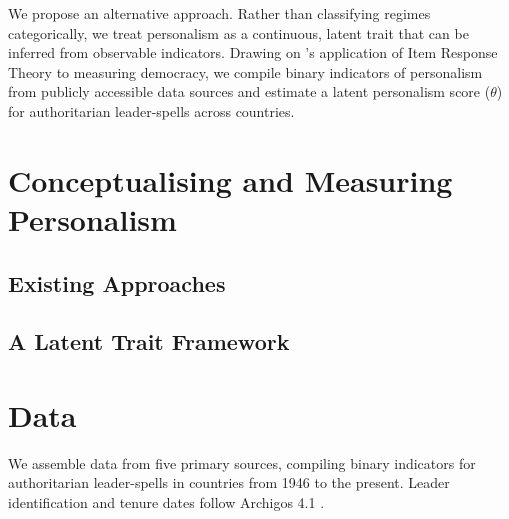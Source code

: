 \documentclass[12pt]{article}
\begin{document}
We propose an alternative approach. Rather than classifying regimes categorically, we treat personalism as a continuous, latent trait that can be inferred from observable indicators. Drawing on \citet{treier2008}'s application of Item Response Theory to measuring democracy, we compile \nIndicators{} binary indicators of personalism from publicly accessible data sources and estimate a latent personalism score ($\theta$) for \nLeaders{} authoritarian leader-spells across \nCountries{} countries.


\section{Conceptualising and Measuring Personalism}


\subsection{Existing Approaches}


\subsection{A Latent Trait Framework}


\section{Data}

We assemble data from five primary sources, compiling \nIndicators{} binary indicators for \nLeaders{} authoritarian leader-spells in \nCountries{} countries from 1946 to the present. Leader identification and tenure dates follow Archigos 4.1 \citep{goemans2009}.
\end{document}
